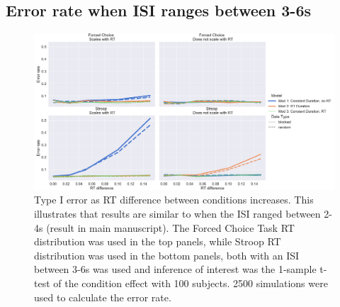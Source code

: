 \documentclass[titlepage,12pt] {article}
\begin{document}
\subsection*{Error rate when ISI ranges between 3-6s}
\begin{figure}[h!]
  \centering
   \includegraphics[width=5in]{Figures/type1_err_36.pdf}
   \caption{Type I error as RT difference between conditions increases.  This illustrates that results are similar to when the ISI ranged between 2-4s (result in main manuscript).  The Forced Choice Task RT distribution was used in the top panels, while Stroop RT distribution was used in the bottom panels, both with an ISI between 3-6s was used and inference of interest was the 1-sample t-test of the condition effect with 100 subjects.  2500 simulations were used to calculate the error rate.}
  \label{fig:type1err_36}
\end{figure}
\end{document}
